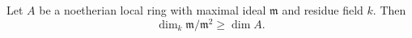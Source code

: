 Let $A$ be a noetherian local ring with maximal ideal $\mathfrak{m}$ and residue field $k$. Then
$$\dim_k \mathfrak{m}/\mathfrak{m}^2 \geq \dim A.$$
